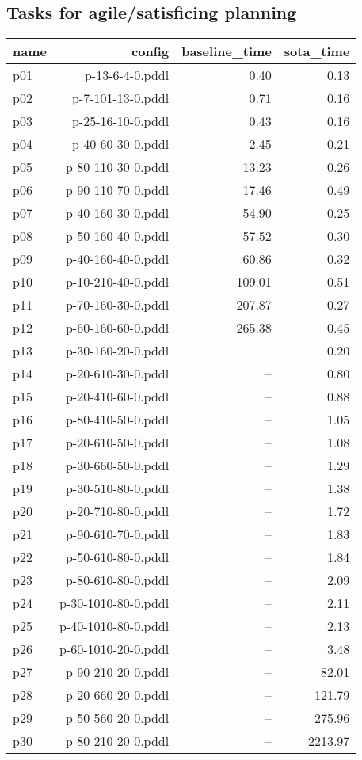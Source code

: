\documentclass{article}
\begin{document}
                    \subsection*{Tasks for agile/satisficing planning}
                    
                            \begin{center}
                            \scriptsize
                            \begin{tabular}{@{}l|r|r|r@{}}
                            name & config & baseline\_time & sota\_time\\\midrule
                              p01& p-13-6-4-0.pddl&0.40&0.13\\
  p02& p-7-101-13-0.pddl&0.71&0.16\\
  p03& p-25-16-10-0.pddl&0.43&0.16\\
  p04& p-40-60-30-0.pddl&2.45&0.21\\
  p05& p-80-110-30-0.pddl&13.23&0.26\\
  p06& p-90-110-70-0.pddl&17.46&0.49\\
  p07& p-40-160-30-0.pddl&54.90&0.25\\
  p08& p-50-160-40-0.pddl&57.52&0.30\\
  p09& p-40-160-40-0.pddl&60.86&0.32\\
  p10& p-10-210-40-0.pddl&109.01&0.51\\
  p11& p-70-160-30-0.pddl&207.87&0.27\\
  p12& p-60-160-60-0.pddl&265.38&0.45\\
  p13& p-30-160-20-0.pddl&--&0.20\\
  p14& p-20-610-30-0.pddl&--&0.80\\
  p15& p-20-410-60-0.pddl&--&0.88\\
  p16& p-80-410-50-0.pddl&--&1.05\\
  p17& p-20-610-50-0.pddl&--&1.08\\
  p18& p-30-660-50-0.pddl&--&1.29\\
  p19& p-30-510-80-0.pddl&--&1.38\\
  p20& p-20-710-80-0.pddl&--&1.72\\
  p21& p-90-610-70-0.pddl&--&1.83\\
  p22& p-50-610-80-0.pddl&--&1.84\\
  p23& p-80-610-80-0.pddl&--&2.09\\
  p24& p-30-1010-80-0.pddl&--&2.11\\
  p25& p-40-1010-80-0.pddl&--&2.13\\
  p26& p-60-1010-20-0.pddl&--&3.48\\
  p27& p-90-210-20-0.pddl&--&82.01\\
  p28& p-20-660-20-0.pddl&--&121.79\\
  p29& p-50-560-20-0.pddl&--&275.96\\
  p30& p-80-210-20-0.pddl&--&2213.97
                            \end{tabular}
                            \end{center}
                    
\end{document}
